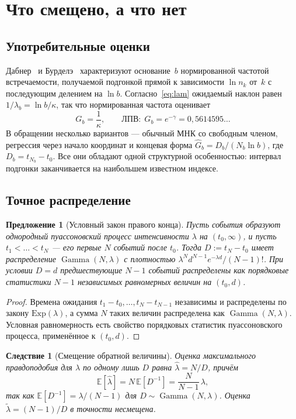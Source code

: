 \documentclass[11pt,a4paper]{article}
\theoremstyle{plain}
\newtheorem{proposition}{Предложение}
\newtheorem{corollary}{Следствие}
\theoremstyle{remark}
\newcommand{\emg}{e^{-\gamma}}
\DeclareMathOperator{\Gam}{Gamma}
\begin{document}
\section{Что смещено, а что нет}\label{sec:notbias}

\subsection{Употребительные оценки}
Дабнер~\cite{dubner1993} и Бурделэ~\cite{bourdelais2009} характеризуют основание~$b$
нормированной частотой встречаемости, получаемой подгонкой прямой к зависимости
$\ln n_k$ от~$k$ с последующим делением на $\ln b$. Согласно~\eqref{eq:lam} ожидаемый
наклон равен $1/\lambda_b=\ln b/\kappa$, так что нормированная частота оценивает
\begin{equation}\label{eq:G}
G_b=\frac{1}{\kappa},\qquad\text{ЛПВ:}\ \ G_b=\emg=0{,}5614595\ldots
\end{equation}
В обращении несколько вариантов --- обычный МНК со свободным членом, регрессия через
начало координат и концевая форма $\hat G_b=D_b/(N_b\ln b)$, где $D_b=t_{N_b}-t_0$.
Все они обладают одной структурной особенностью: интервал подгонки заканчивается на наибольшем
известном индексе.

\subsection{Точное распределение}

\begin{proposition}[Условный закон правого конца]\label{prop:gamma}
Пусть события образуют однородный пуассоновский процесс интенсивности $\lambda$ на
$(t_0,\infty)$, и пусть $t_1<\dots<t_N$ --- его первые $N$ событий после $t_0$.
Тогда $D:=t_N-t_0$ имеет распределение $\Gam(N,\lambda)$ с плотностью
$\lambda^{N}d^{N-1}e^{-\lambda d}/(N-1)!$. При условии $D=d$ предшествующие $N-1$ событий
распределены как порядковые статистики $N-1$ независимых равномерных величин на $(t_0,d)$.
\end{proposition}

\begin{proof}
Времена ожидания $t_1-t_0,\dots,t_N-t_{N-1}$ независимы и распределены по закону
$\mathrm{Exp}(\lambda)$, а сумма $N$ таких величин распределена как $\Gam(N,\lambda)$.
Условная равномерность есть свойство порядковых статистик пуассоновского процесса,
применённое к $(t_0,d)$.
\end{proof}

\begin{corollary}[Смещение обратной величины]\label{cor:kappa}
Оценка максимального правдоподобия для $\lambda$ по одному лишь $D$ равна
$\hat\lambda=N/D$, причём
\begin{equation}\label{eq:bias}
\mathbb E[\hat\lambda]=N\,\mathbb E[D^{-1}]=\frac{N}{N-1}\,\lambda,
\end{equation}
так как $\mathbb E[D^{-1}]=\lambda/(N-1)$ для $D\sim\Gam(N,\lambda)$. Оценка
$\tilde\lambda=(N-1)/D$ в точности несмещена.
\end{corollary}
\end{document}
